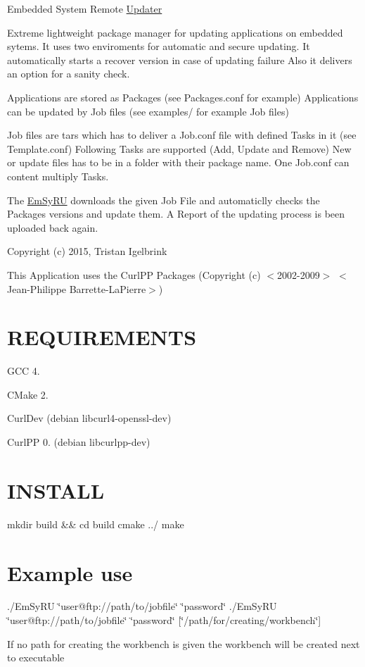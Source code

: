 Embedded System Remote \hyperlink{classUpdater}{Updater}

Extreme lightweight package manager for updating applications on embedded sytems. It uses two enviroments for automatic and secure updating. It automatically starts a recover version in case of updating failure Also it delivers an option for a sanity check.

Applications are stored as Packages (see Packages.\-conf for example) Applications can be updated by Job files (see examples/ for example Job files)

Job files are tars which has to deliver a Job.\-conf file with defined Tasks in it (see Template.\-conf) Following Tasks are supported (Add, Update and Remove) New or update files has to be in a folder with their package name. One Job.\-conf can content multiply Tasks.

The \hyperlink{classEmSyRU}{Em\-Sy\-R\-U} downloads the given Job File and automaticlly checks the Packages versions and update them. A Report of the updating process is been uploaded back again.

Copyright (c) 2015, Tristan Igelbrink

This Application uses the Curl\-P\-P Packages (Copyright (c) $<$2002-\/2009$>$ $<$Jean-\/\-Philippe Barrette-\/\-La\-Pierre$>$)

\section*{R\-E\-Q\-U\-I\-R\-E\-M\-E\-N\-T\-S }


\begin{DoxyItemize}
\item G\-C\-C 4.
\item C\-Make 2.
\item Curl\-Dev (debian libcurl4-\/openssl-\/dev)
\item Curl\-P\-P 0. (debian libcurlpp-\/dev)
\end{DoxyItemize}

\section*{I\-N\-S\-T\-A\-L\-L }

mkdir build \&\& cd build cmake ../ make

\section*{Example use }

./\-Em\-Sy\-R\-U \char`\"{}user@ftp\-://path/to/jobfile\char`\"{} \char`\"{}password\char`\"{} ./\-Em\-Sy\-R\-U \char`\"{}user@ftp\-://path/to/jobfile\char`\"{} \char`\"{}password\char`\"{} \mbox{[}\char`\"{}/path/for/creating/workbench\char`\"{}\mbox{]}

If no path for creating the workbench is given the workbench will be created next to executable 